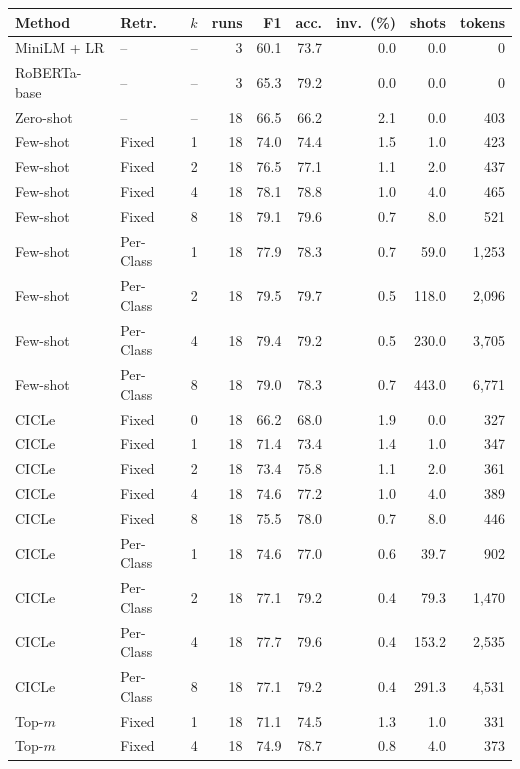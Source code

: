 \begin{tabular}{llrrrrrrr}
\toprule
Method & Retr. & $k$ & runs & F1 & acc. & inv.\ (\%) & shots & tokens \\
\midrule
MiniLM + LR & -- & -- & 3 & 60.1 & 73.7 & 0.0 & 0.0 & 0 \\
RoBERTa-base & -- & -- & 3 & 65.3 & 79.2 & 0.0 & 0.0 & 0 \\
\midrule
Zero-shot & -- & -- & 18 & 66.5 & 66.2 & 2.1 & 0.0 & 403 \\
\midrule
Few-shot & Fixed & 1 & 18 & 74.0 & 74.4 & 1.5 & 1.0 & 423 \\
Few-shot & Fixed & 2 & 18 & 76.5 & 77.1 & 1.1 & 2.0 & 437 \\
Few-shot & Fixed & 4 & 18 & 78.1 & 78.8 & 1.0 & 4.0 & 465 \\
Few-shot & Fixed & 8 & 18 & 79.1 & 79.6 & 0.7 & 8.0 & 521 \\
Few-shot & Per-Class & 1 & 18 & 77.9 & 78.3 & 0.7 & 59.0 & 1,253 \\
Few-shot & Per-Class & 2 & 18 & 79.5 & 79.7 & 0.5 & 118.0 & 2,096 \\
Few-shot & Per-Class & 4 & 18 & 79.4 & 79.2 & 0.5 & 230.0 & 3,705 \\
Few-shot & Per-Class & 8 & 18 & 79.0 & 78.3 & 0.7 & 443.0 & 6,771 \\
CICLe & Fixed & 0 & 18 & 66.2 & 68.0 & 1.9 & 0.0 & 327 \\
CICLe & Fixed & 1 & 18 & 71.4 & 73.4 & 1.4 & 1.0 & 347 \\
CICLe & Fixed & 2 & 18 & 73.4 & 75.8 & 1.1 & 2.0 & 361 \\
CICLe & Fixed & 4 & 18 & 74.6 & 77.2 & 1.0 & 4.0 & 389 \\
CICLe & Fixed & 8 & 18 & 75.5 & 78.0 & 0.7 & 8.0 & 446 \\
CICLe & Per-Class & 1 & 18 & 74.6 & 77.0 & 0.6 & 39.7 & 902 \\
CICLe & Per-Class & 2 & 18 & 77.1 & 79.2 & 0.4 & 79.3 & 1,470 \\
CICLe & Per-Class & 4 & 18 & 77.7 & 79.6 & 0.4 & 153.2 & 2,535 \\
CICLe & Per-Class & 8 & 18 & 77.1 & 79.2 & 0.4 & 291.3 & 4,531 \\
\midrule
Top-$m$ & Fixed & 1 & 18 & 71.1 & 74.5 & 1.3 & 1.0 & 331 \\
Top-$m$ & Fixed & 4 & 18 & 74.9 & 78.7 & 0.8 & 4.0 & 373 \\

\end{tabular}
